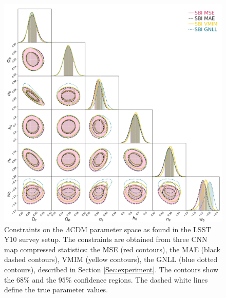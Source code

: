 \documentclass{aa}
\begin{document}
\begin{figure}
    \centering
        \includegraphics[width=\textwidth]{figures/contours_posterior_loss_dashed.pdf}
        \caption{
        Constraints on the $\Lambda$CDM parameter space as found in the LSST Y10 survey setup. The constraints are obtained from three CNN map compressed statistics: the MSE (red contours), the MAE (black dashed contours), VMIM (yellow contours), the GNLL (blue dotted contours), described in Section \ref{Sec:experiment}.
        The contours show the $68\%$ and the $95\%$  confidence regions. The dashed white lines define the true parameter values.}
        \label{fig:contours_posterior_diff_loss}
\end{figure}
\end{document}
